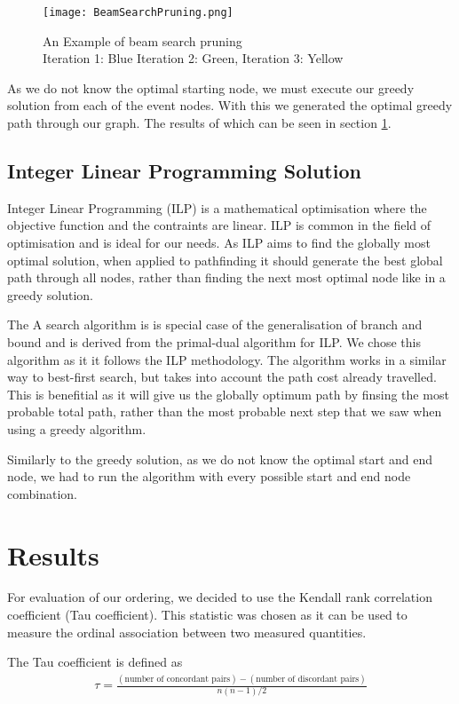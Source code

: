 \documentclass[bsc,frontabs,twoside,singlespacing,parskip,deptreport]{infthesis}     %
\begin{document}
\begin{figure}
  \texttt{[image: BeamSearchPruning.png]}
  \caption{An Example of beam search pruning\\ Iteration 1: Blue Iteration 2: Green, Iteration 3: Yellow}
  \label{fig:beam-prune}
\end{figure}

As we do not know the optimal starting node, we must execute our greedy solution from each of the event nodes.
With this we generated the optimal greedy path through our graph. The results of which can be seen in section \ref{sec:graph-results}.

\subsection{Integer Linear Programming Solution}
Integer Linear Programming (ILP) is a mathematical optimisation where the objective function and the contraints are linear.
ILP is common in the field of optimisation and is ideal for our needs. As ILP aims to find the globally most optimal solution, when applied to pathfinding it
should generate the best global path through all nodes, rather than finding the next most optimal node like in a greedy solution.


The A\* search algorithm is is special case of the generalisation of branch and bound\cite{balas1983branch} and is derived from the primal-dual algorithm for ILP\cite{ye2012note}.
We chose this algorithm as it it follows the ILP methodology. The algorithm works in a similar way to best-first search, but takes into account the path cost already travelled.
This is benefitial as it will give us the globally optimum path by finsing the most probable total path, rather than the most probable next step that we saw when using a
greedy algorithm.

Similarly to the greedy solution, as we do not know the optimal start and end node, we had to run the algorithm with every possible start and end node combination.

\section{Results}\label{sec:graph-results}
For evaluation of our ordering, we decided to use the Kendall rank correlation coefficient (Tau coefficient).
This statistic was chosen as it can be used to measure the ordinal association between two measured quantities.


The Tau coefficient is defined as
\begin{eqnarray}
  \tau=\frac{(\text{number of concordant pairs})-(\text{number of discordant pairs})}{n(n-1)/2}\nonumber
\end{eqnarray}\cite{abdi2007kendall}
\end{document}
